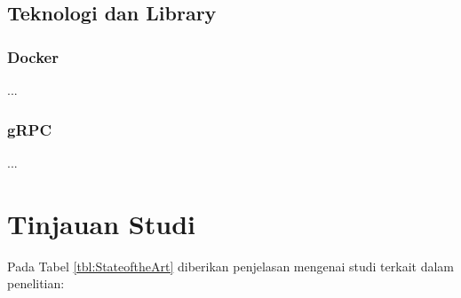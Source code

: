\subsection{Teknologi dan Library}
\subsubsection{Docker}
...
\subsubsection{gRPC}
...

\section{Tinjauan Studi}
\par Pada Tabel \ref{tbl:StateoftheArt} diberikan penjelasan mengenai studi terkait dalam penelitian:

